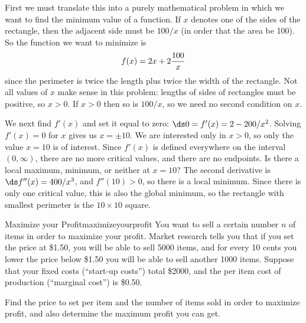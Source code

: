 \begin{solution} 
First we must translate this into a purely mathematical problem in
which we want to find the minimum value of a function.
If $x$ denotes one of the sides of the rectangle, then the adjacent side
must be $100/x$ (in order that the area be 100).  So the function we want
to minimize is 
$$
  f(x)=2x+2{100\over x}
$$
since the perimeter is twice the length plus twice the width of the
rectangle. Not all values of $x$ make sense in this problem: lengths
of sides of rectangles must be positive, so $x>0$. If $x>0$ then so is
$100/x$, so we need no second condition on $x$.

We next find $f'(x)$ and set it equal to zero: $\ds 0=f'(x)=2-200/x^2$.
Solving $f'(x)=0$ for $x$ gives us $x=\pm 10$. We are interested only
in $x>0$, so only the value $x=10$ is of interest. Since $f'(x)$ is
defined everywhere on the interval $(0,\infty)$, there are no more
critical values, and there are no endpoints. Is there a local maximum,
minimum, or neither at $x=10$? The second derivative is
$\ds f''(x)=400/x^3$, and $f''(10)>0$, so there is a local minimum. Since
there is only one critical value, this is also the global minimum, so the
rectangle with smallest perimeter is the $10\times10$ square.
\end{solution}

\begin{example}{Maximize your Profit}{maximizeyourprofit}
You want to sell a certain number $n$ of items in order to maximize your
profit.  Market research tells you that if you set the price at \$1.50, you
will be able to sell 5000 items, and for every 10 cents you lower the price
below \$1.50 you will be able to sell another 1000 items.  Suppose that
your fixed costs (``start-up costs'') total \$2000, and the per item cost
of production (``marginal cost'') is \$0.50.  

Find the price to set per
item and the number of items sold in order to maximize profit, and also
determine the maximum profit you can get.
\end{example}

